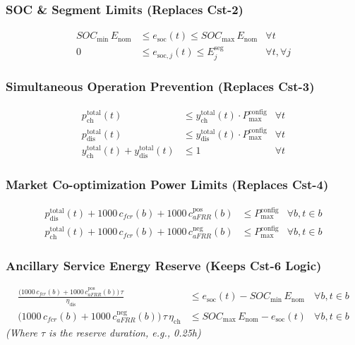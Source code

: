 \documentclass[11pt, a4paper]{article}
\begin{document}
\subsubsection{SOC \& Segment Limits (Replaces Cst-2)}
\begin{align}
SOC_{\min}\,E_{\mathrm{nom}} &\le e_{\mathrm{soc}}(t) \le SOC_{\max}\,E_{\mathrm{nom}} & \forall t \\
0 &\le e_{\mathrm{soc},j}(t) \le E^{\mathrm{seg}}_{j} & \forall t, \forall j
\end{align}

\subsubsection{Simultaneous Operation Prevention (Replaces Cst-3)}
\begin{align}
p^{\mathrm{total}}_{\mathrm{ch}}(t) &\le y^{\mathrm{total}}_{\mathrm{ch}}(t) \cdot P^{\mathrm{config}}_{\max} & \forall t \\
p^{\mathrm{total}}_{\mathrm{dis}}(t) &\le y^{\mathrm{total}}_{\mathrm{dis}}(t) \cdot P^{\mathrm{config}}_{\max} & \forall t \\
y^{\mathrm{total}}_{\mathrm{ch}}(t) + y^{\mathrm{total}}_{\mathrm{dis}}(t) &\le 1 & \forall t
\end{align}

\subsubsection{Market Co-optimization Power Limits (Replaces Cst-4)}
\begin{align}
p^{\mathrm{total}}_{\mathrm{dis}}(t) + 1000\,c_{fcr}(b) + 1000\,c^{\mathrm{pos}}_{aFRR}(b) &\le P^{\mathrm{config}}_{\max} & \forall b, t \in b \\
p^{\mathrm{total}}_{\mathrm{ch}}(t) + 1000\,c_{fcr}(b) + 1000\,c^{\mathrm{neg}}_{aFRR}(b) &\le P^{\mathrm{config}}_{\max} & \forall b, t \in b
\end{align}

\subsubsection{Ancillary Service Energy Reserve (Keeps Cst-6 Logic)}
\begin{align}
    \frac{\big(1000\,c_{fcr}(b) + 1000\,c^{\mathrm{pos}}_{aFRR}(b)\big)\,\tau}{\eta_{\mathrm{dis}}} &\leq e_{\mathrm{soc}}(t) - SOC_{\min}\,E_{\mathrm{nom}} & \forall b, t \in b \\
    \big(1000\,c_{fcr}(b) + 1000\,c^{\mathrm{neg}}_{aFRR}(b)\big)\,\tau\,\eta_{\mathrm{ch}} &\leq SOC_{\max}\,E_{\mathrm{nom}} - e_{\mathrm{soc}}(t) & \forall b, t \in b
\end{align}
\textit{(Where $\tau$ is the reserve duration, e.g., 0.25h)}
\end{document}
